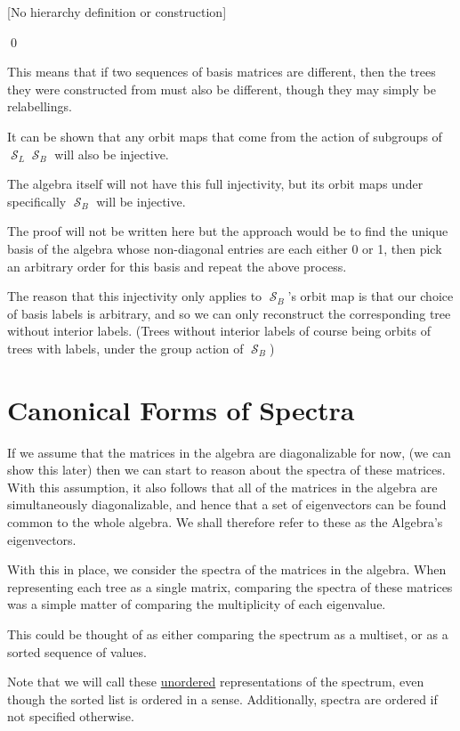 \documentclass[10pt,a4paper]{report}
\DeclareMathOperator{\S}{\mathcal{S}}
\begin{document}
[No hierarchy definition or construction]

\qed

This means that if two sequences of basis matrices are different, then the trees they were constructed from must also be different, though they may simply be relabellings.

It can be shown that any orbit maps that come from the action of subgroups of $\S_L\S_B$ will also be injective.

The algebra itself will not have this full injectivity, but its orbit maps under specifically $\S_B$ will be injective.

The proof will not be written here but the approach would be to find the unique basis of the algebra whose non-diagonal entries are each either 0 or 1, then pick an arbitrary order for this basis and repeat the above process.

The reason that this injectivity only applies to $\S_B$'s orbit map is that our choice of basis labels is arbitrary, and so we can only reconstruct the corresponding tree without interior labels. (Trees without interior labels of course being orbits of trees with labels, under the group action of $\S_B$)

\section{Canonical Forms of Spectra}

If we assume that the matrices in the algebra are diagonalizable for now, (we
can show this later) then we can start to reason about the spectra of these
matrices.
With this assumption, it also follows that all of the matrices in the
algebra are simultaneously diagonalizable, and hence that a set of eigenvectors
can be found common to the whole algebra.
We shall therefore refer to these as the Algebra's eigenvectors.

With this in place, we consider the spectra of the matrices in the algebra.
When representing each tree as a single matrix, comparing the spectra of these
matrices was a simple matter of comparing the multiplicity of each eigenvalue.

This could be thought of as either comparing the spectrum as a multiset, or as
a sorted sequence of values.

Note that we will call these \underline{unordered} representations of the spectrum, even though the sorted list is ordered in a sense. Additionally, spectra are ordered if not specified otherwise.
\end{document}
